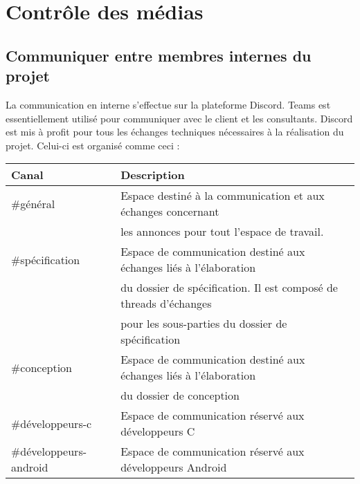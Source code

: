 \documentclass[a4paper,11pt,titlepage]{article}
\begin{document}
\section{Contrôle des médias}
\subsection{Communiquer entre membres internes du projet} \label{sec:ComInterne}
La communication en interne s'effectue sur la plateforme Discord.
Teams est essentiellement utilisé pour communiquer avec le client et les consultants.
Discord est mis à profit pour tous les échanges techniques nécessaires
à la réalisation du projet. Celui-ci est organisé comme ceci :

\begin{table}[H]
    \begin{tabular}{|l|l|}
        \hline
        \rowcolor[HTML]{CCCCCC}
        Canal                  & Description                                                           \\ \hline
        \#général              & Espace destiné à la communication et aux échanges concernant          \\
                               & les annonces pour tout l'espace de travail.                           \\ \hline
        \#spécification        & Espace de communication destiné aux échanges liés à l'élaboration     \\
                               & du dossier de spécification. Il est composé de threads d'échanges     \\
                               & pour les sous-parties du dossier de spécification                     \\ \hline
        \#conception           & Espace de communication destiné aux échanges liés à l'élaboration     \\
                               & du dossier de conception                                              \\ \hline
        \#développeurs-c       & Espace de communication réservé aux développeurs C                    \\ \hline
        \#développeurs-android & Espace de communication réservé aux développeurs Android              \\ \hline

\end{tabular}
\end{table}
\end{document}
